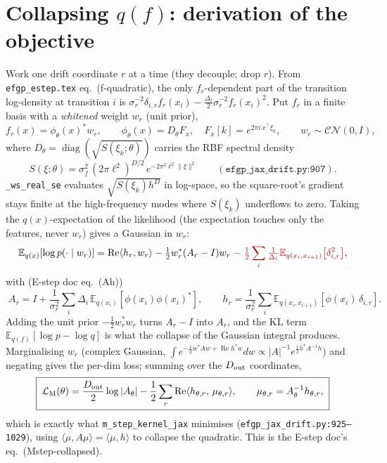 \documentclass[11pt]{article}
\newcommand{\Eqx}{\mathbb{E}_{q(x_i)}}
\newcommand{\Eqxx}{\mathbb{E}_{q(x_i,x_{i+1})}}
\newcommand{\Eq}[2]{\mathbb{E}_{#1}\!\left[#2\right]}
\renewcommand{\Re}{\operatorname{Re}}
\newcommand{\diag}{\operatorname{diag}}
\newcommand{\given}{\mid}
\newcommand{\code}[1]{\texttt{#1}}
\newcommand{\Dt}{D_{\rm out}}
\newcommand{\dropped}[1]{\textcolor{red!70!black}{#1}}
\begin{document}
\section{Collapsing $q(f)$: derivation of the objective}
Work one drift coordinate $r$ at a time (they decouple; drop $r$). From
\texttt{efgp\_estep.tex} eq.~(f-quadratic), the only $f_r$-dependent part of the
transition log-density at transition $i$ is
$\sigma_r^{-2}\delta_{i,r}f_r(x_i)-\tfrac{\Delta_i}{2}\sigma_r^{-2}f_r(x_i)^2$.
Put $f_r$ in a finite basis with a \emph{whitened} weight $w_r$ (unit prior),
\begin{equation}
f_r(x)=\phi_\theta(x)^*w_r,\qquad \phi_\theta(x)=D_\theta F_x,\quad F_x[k]=e^{2\pi i\,x^\top\xi_k},\qquad w_r\sim\mathcal{CN}(0,I),
\label{eq:basis}
\end{equation}
where $D_\theta=\diag(\sqrt{S(\xi_k;\theta)})$ carries the RBF spectral density
\begin{equation}
S(\xi;\theta)=\sigma_f^2\,(2\pi\ell^2)^{D/2}\,e^{-2\pi^2\ell^2\|\xi\|^2}
\qquad(\texttt{efgp\_jax\_drift.py:907}).
\label{eq:specdens}
\end{equation}
\code{\_ws\_real\_se} evaluates $\sqrt{S(\xi_k)h^D}$ in log-space, so the
square-root's gradient stays finite at the high-frequency modes where
$S(\xi_k)$ underflows to zero.
Taking the $q(x)$-expectation of the likelihood (the expectation touches only the
features, never $w_r$) gives a Gaussian in $w_r$:
\begin{equation}
\Eq{q(x)}{\log p(\cdot\given w_r)}
=\Re\langle h_r,w_r\rangle-\tfrac12 w_r^*(A_r-I)w_r
\;\dropped{-\;\tfrac{1}{2}\sum_i\tfrac{1}{\Delta_i}\Eq{q(x_i,x_{i+1})}{\delta_{i,r}^2}},
\label{eq:loglik-w}
\end{equation}
with (E-step doc eq.~(Ah))
\begin{equation}
\boxed{\;
A_r=I+\frac{1}{\sigma_r^2}\sum_i\Delta_i\,\Eqx[\phi(x_i)\phi(x_i)^*],
\qquad
h_r=\frac{1}{\sigma_r^2}\sum_i \Eqxx[\phi(x_i)\,\delta_{i,r}].
\;}
\label{eq:Ah}
\end{equation}
Adding the unit prior $-\tfrac12 w_r^*w_r$ turns $A_r-I$ into $A_r$, and the KL
term $\Eq{q(f)}{\log p-\log q}$ is what the collapse of the Gaussian integral
produces. Marginalising $w_r$ (complex Gaussian, $\int e^{-\frac12 w^*Aw+\Re h^*w}dw
\propto|A|^{-1}e^{\frac12 h^*A^{-1}h}$) and negating gives the per-dim loss; summing
over the $\Dt$ coordinates,
\begin{equation}
\boxed{\;
\mathcal L_{\rm M}(\theta)
=\frac{\Dt}{2}\log|A_\theta|
-\frac12\sum_{r}\Re\langle h_{\theta,r},\,\mu_{\theta,r}\rangle,
\qquad \mu_{\theta,r}=A_\theta^{-1}h_{\theta,r},
\;}
\label{eq:Mstep}
\end{equation}
which is exactly what \code{m\_step\_kernel\_jax} minimises
(\texttt{efgp\_jax\_drift.py:925--1029}), using
$\langle\mu,A\mu\rangle=\langle\mu,h\rangle$ to collapse the quadratic.
This is the E-step doc's eq.~(Mstep-collapsed).
\end{document}
